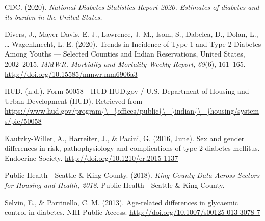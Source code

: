 \documentclass [11pt, proquest] {uwthesis}[2015/03/03]
\begin{document}

\noindent

\setlength{\parindent}{-0.20in} \setlength{\leftskip}{0.20in}
\setlength{\parskip}{8pt}

\hypertarget{refs}{}
\hypertarget{ref-CDC2020}{}
CDC. (2020). \emph{National Diabetes Statistics Report 2020. Estimates
of diabetes and its burden in the United States.}

\hypertarget{ref-Divers2020}{}
Divers, J., Mayer-Davis, E. J., Lawrence, J. M., Isom, S., Dabelea, D.,
Dolan, L., \ldots{} Wagenknecht, L. E. (2020). Trends in Incidence of
Type 1 and Type 2 Diabetes Among Youths --- Selected Counties and Indian
Reservations, United States, 2002--2015. \emph{MMWR. Morbidity and
Mortality Weekly Report}, \emph{69}(6), 161--165.
\url{http://doi.org/10.15585/mmwr.mm6906a3}

\hypertarget{ref-HUD}{}
HUD. (n.d.). Form 50058 - HUD \textbar{} HUD.gov / U.S. Department of
Housing and Urban Development (HUD). Retrieved from
\href{https://www.hud.gov/program\%7B/_\%7Doffices/public\%7B/_\%7Dindian\%7B/_\%7Dhousing/systems/pic/50058}{https://www.hud.gov/program\{\textbackslash{}\_\}offices/public\{\textbackslash{}\_\}indian\{\textbackslash{}\_\}housing/systems/pic/50058}

\hypertarget{ref-Kautzky-Willer2016}{}
Kautzky-Willer, A., Harreiter, J., \& Pacini, G. (2016, June). Sex and
gender differences in risk, pathophysiology and complications of type 2
diabetes mellitus. Endocrine Society.
\url{http://doi.org/10.1210/er.2015-1137}

\hypertarget{ref-PublicHealth-SeattleandKingCounty2018}{}
Public Health - Seattle \& King County. (2018). \emph{King County Data
Across Sectors for Housing and Health, 2018}. Public Health - Seattle \&
King County.

\hypertarget{ref-Selvin2013}{}
Selvin, E., \& Parrinello, C. M. (2013). Age-related differences in
glycaemic control in diabetes. NIH Public Access.
\url{http://doi.org/10.1007/s00125-013-3078-7}
\end{document}
